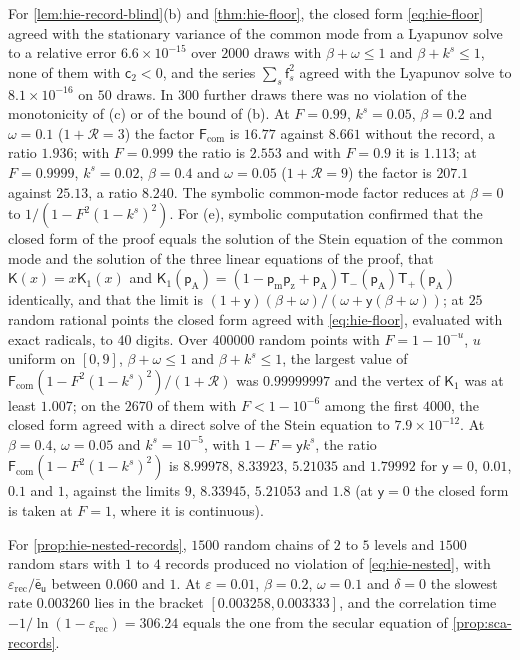 \begin{numcheck}
For \cref{lem:hie-record-blind}(b) and \cref{thm:hie-floor}, the closed form \eqref{eq:hie-floor} agreed with the stationary variance of the common mode from a Lyapunov solve to a relative error $6.6\times10^{-15}$ over $2000$ draws with $\beta+\omega\le1$ and $\beta+k^s\le1$, none of them with $\mathsf c_2<0$, and the series $\sum_s\mathsf f_s^2$ agreed with the Lyapunov solve to $8.1\times10^{-16}$ on $50$ draws. In $300$ further draws there was no violation of the monotonicity of (c) or of the bound of (b). At $F=0.99$, $k^s=0.05$, $\beta=0.2$ and $\omega=0.1$ ($1+\mathcal R=3$) the factor $\mathsf F_{\mathrm{com}}$ is $16.77$ against $8.661$ without the record, a ratio $1.936$; with $F=0.999$ the ratio is $2.553$ and with $F=0.9$ it is $1.113$; at $F=0.9999$, $k^s=0.02$, $\beta=0.4$ and $\omega=0.05$ ($1+\mathcal R=9$) the factor is $207.1$ against $25.13$, a ratio $8.240$. The symbolic common-mode factor reduces at $\beta=0$ to $1/(1-F^2(1-k^s)^2)$. For (e), symbolic computation confirmed that the closed form of the proof equals the solution of the Stein equation of the common mode and the solution of the three linear equations of the proof, that $\mathsf K(x)=x\mathsf K_1(x)$ and $\mathsf K_1(\mathsf p_{\mathrm A})=(1-\mathsf p_{\mathrm m}\mathsf p_{\mathrm z}+\mathsf p_{\mathrm A})\mathsf T_-(\mathsf p_{\mathrm A})\mathsf T_+(\mathsf p_{\mathrm A})$ identically, and that the limit is $(1+\mathsf y)(\beta+\omega)/(\omega+\mathsf y(\beta+\omega))$; at $25$ random rational points the closed form agreed with \eqref{eq:hie-floor}, evaluated with exact radicals, to $40$ digits. Over $400000$ random points with $F=1-10^{-u}$, $u$ uniform on $[0,9]$, $\beta+\omega\le1$ and $\beta+k^s\le1$, the largest value of $\mathsf F_{\mathrm{com}}(1-F^2(1-k^s)^2)/(1+\mathcal R)$ was $0.99999997$ and the vertex of $\mathsf K_1$ was at least $1.007$; on the $2670$ of them with $F<1-10^{-6}$ among the first $4000$, the closed form agreed with a direct solve of the Stein equation to $7.9\times10^{-12}$. At $\beta=0.4$, $\omega=0.05$ and $k^s=10^{-5}$, with $1-F=\mathsf yk^s$, the ratio $\mathsf F_{\mathrm{com}}(1-F^2(1-k^s)^2)$ is $8.99978$, $8.33923$, $5.21035$ and $1.79992$ for $\mathsf y=0$, $0.01$, $0.1$ and $1$, against the limits $9$, $8.33945$, $5.21053$ and $1.8$ (at $\mathsf y=0$ the closed form is taken at $F=1$, where it is continuous).

For \cref{prop:hie-nested-records}, $1500$ random chains of $2$ to $5$ levels and $1500$ random stars with $1$ to $4$ records produced no violation of \eqref{eq:hie-nested}, with $\varepsilon_{\mathrm{rec}}/\bar{\mathsf e}_{\mathsf u}$ between $0.060$ and $1$. At $\varepsilon=0.01$, $\beta=0.2$, $\omega=0.1$ and $\delta=0$ the slowest rate $0.003260$ lies in the bracket $[0.003258,0.003333]$, and the correlation time $-1/\ln(1-\varepsilon_{\mathrm{rec}})=306.24$ equals the one from the secular equation of \cref{prop:sca-records}.
\end{numcheck}

